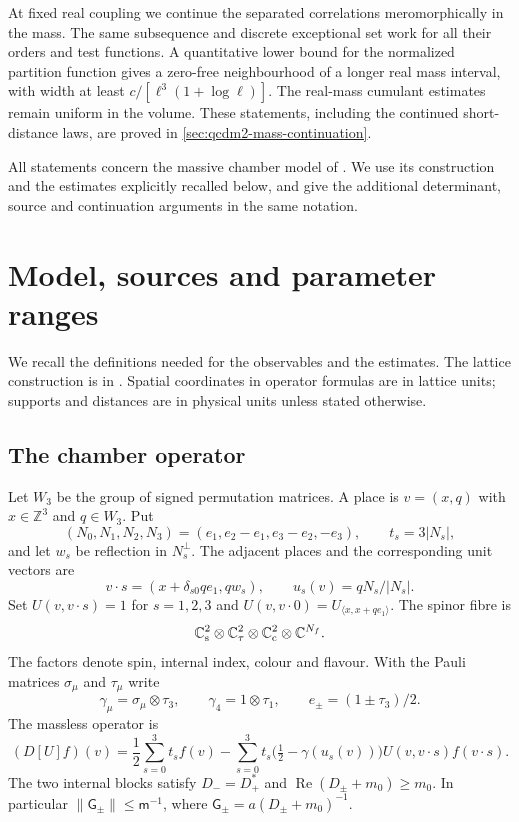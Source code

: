\documentclass[11pt,letterpaper,reqno]{amsart}
\theoremstyle{definition}
\theoremstyle{remark}
\begin{document}
At fixed real coupling we continue the separated correlations
meromorphically in the mass. The same subsequence and discrete
exceptional set work for all their orders and test functions.
A quantitative lower bound for the normalized partition
function gives a zero-free neighbourhood of a longer real
mass interval, with width at least
$c/[\ell^3(1+\log\ell)]$. The real-mass cumulant estimates
remain uniform in the volume. These statements, including
the continued short-distance laws, are proved in
\cref{sec:qcdm2-mass-continuation}.

All statements concern the massive chamber model of \cite{QCDM1}.
We use its construction and the estimates explicitly recalled below,
and give the additional determinant, source and continuation
arguments in the same notation.

\section{Model, sources and parameter ranges}\label{sec:qcdm2-setting}

We recall the definitions needed for the observables and the
estimates. The lattice construction is in
\cite[\S2]{QCDM1}. Spatial coordinates in operator formulas
are in lattice units; supports and distances are in physical
units unless stated otherwise.

\subsection{The chamber operator}

Let $W_3$ be the group of signed permutation matrices.
A place is $v=(x,q)$ with $x\in\mathbb Z^3$ and $q\in W_3$.
Put
\[
 (N_0,N_1,N_2,N_3)=(e_1,e_2-e_1,e_3-e_2,-e_3),
 \qquad t_s=3|N_s|,
\]
and let $w_s$ be reflection in $N_s^\perp$. The adjacent
places and the corresponding unit vectors are
\[
 v\cdot s=(x+\delta_{s0}qe_1,qw_s),\qquad
 u_s(v)=qN_s/|N_s|.
\]
Set $U(v,v\cdot s)=1$ for $s=1,2,3$ and
$U(v,v\cdot0)=U_{\langle x,x+qe_1\rangle}$.
The spinor fibre is
\[
 \mathbb C^2_{\rm s}\otimes\mathbb C^2_\tau
       \otimes\mathbb C^2_{\rm c}\otimes\mathbb C^{N_f}.
\]
The factors denote spin, internal index, colour and flavour.
With the Pauli matrices $\sigma_\mu$ and $\tau_\mu$ write
\[
 \gamma_\mu=\sigma_\mu\otimes\tau_3,\qquad
 \gamma_4=1\otimes\tau_1,\qquad e_\pm=(1\pm\tau_3)/2.
\]
The massless operator is
\begin{equation}\label{eq:qcdm2-Dirac}
 (D[U]f)(v)=\frac12\sum_{s=0}^3t_s f(v)
 -\sum_{s=0}^3t_s\bigl(\tfrac12-\gamma(u_s(v))\bigr)
                   U(v,v\cdot s)f(v\cdot s).
\end{equation}
The two internal blocks satisfy $D_-=D_+^*$ and
$\operatorname{Re}(D_\pm+m_0)\ge m_0$. In particular
$\|\mathsf G_\pm\|\le\mathsf m^{-1}$, where
$\mathsf G_\pm=a(D_\pm+m_0)^{-1}$.
\end{document}
